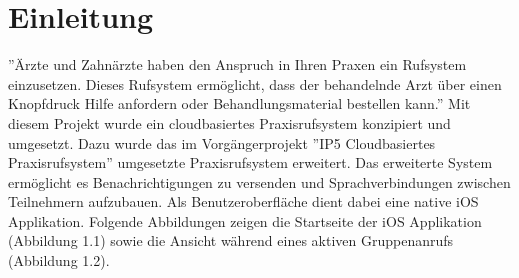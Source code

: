 \section{Einleitung}

''Ärzte und Zahnärzte haben den Anspruch in Ihren Praxen ein Rufsystem einzusetzen.
Dieses Rufsystem ermöglicht, dass der behandelnde Arzt über einen Knopfdruck Hilfe anfordern oder Behandlungsmaterial bestellen kann.''\cite{aufgabenstellung}
Mit diesem Projekt wurde ein cloudbasiertes Praxisrufsystem konzipiert und umgesetzt.
Dazu wurde das im Vorgängerprojekt ''IP5 Cloudbasiertes Praxisrufsystem'' umgesetzte Praxisrufsystem erweitert.
Das erweiterte System ermöglicht es Benachrichtigungen zu versenden und Sprachverbindungen zwischen Teilnehmern aufzubauen.
Als Benutzeroberfläche dient dabei eine native iOS Applikation.
Folgende Abbildungen zeigen die Startseite der iOS Applikation (Abbildung 1.1) sowie die Ansicht während eines aktiven Gruppenanrufs (Abbildung 1.2).

